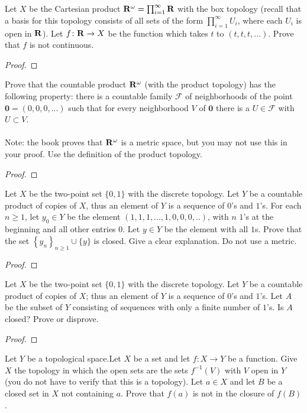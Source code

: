 \begin{problem}
Let $X$ be the Cartesian product
$\mathbf{R}^\omega=\prod_{i=1}^\infty\mathbf{R}$ with the box topology (recall
that a basis for this topology consists of all sets of the form
$\prod_{i=1}^\infty U_i$, where each $U_i$ is open in $\mathbf{R}$). Let
$f\colon\mathbf{R}\to X$ be the function which takes $t$ to
$(t,t,t,...)$. Prove that $f$ is not continuous.
\end{problem}
\begin{proof}
\end{proof}
\begin{problem}
Prove that the countable product $\mathbf{R}^\omega$ (with the product
topology) has the following property: there is a countable family
$\mathcal{F}$ of neighborhoods of the point
$\mathbf{0}=(0,0,0,...)$ such that for every neighborhood $V$ of
$\mathbf{0}$ there is a $U\in\mathcal{F}$ with $U\subset V$.
\\\\
Note: the book proves that $\mathbf{R}^\omega$ is a metric space, but
you may not use this in your proof. Use the definition of the
product topology.
\end{problem}
\begin{proof}
\end{proof}
\begin{problem}
Let $X$ be the two-point set $\{0,1\}$ with the discrete
topology. Let $Y$ be a countable product of copies of $X$, thus
an element of $Y$ is a sequence of $0$'s and $1$'s. For each
$n\geq 1$, let $y_0\in Y$ be the element
$(1,1,1,...,1,0,0,0,..)$, with $n$ $1$'s at the beginning and all
other entries $0$. Let $y\in Y$ be the element with all
$1$s. Prove that the set $\left\{y_n\right\}_{n\geq 1}\cup\{y\}$
is closed. Give a clear explanation. Do not use a metric.
\end{problem}
\begin{proof}
\end{proof}
\begin{problem}
Let $X$ be the two-point set $\{0,1\}$ with the discrete
topology. Let $Y$ be a countable product of copies of $X$; thus
an element of $Y$ is a sequence of $0$'s and $1$'s. Let $A$ be
the subset of $Y$ consisting of sequences with only a finite
number of $1$'s. Is $A$ closed? Prove or disprove.
\end{problem}
\begin{proof}
\end{proof}
\begin{problem}
Let $Y$ be a topological space.Let $X$ be a set and let $f\colon
X\to Y$ be a function. Give $X$ the topology in which the open
sets are the sets $f^{-1}(V)$ with $V$ open in $Y$ (you do not
have to verify that this is a topology). Let $a\in X$ and let $B$
be a closed set in $X$ not containing $a$. Prove that $f(a)$ is
not in the closure of $f(B)$.
\end{problem}
